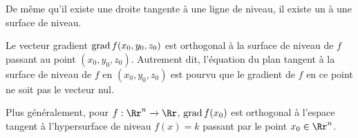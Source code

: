 \documentclass[11pt, class=report,crop=false]{standalone}
\begin{document}
De même qu'il existe une droite tangente à une ligne de niveau, il existe un  à une surface de niveau.


\begin{proposition}
Le vecteur gradient $\operatorname{grad} f(x_0,y_0,z_0)$ est orthogonal à la surface de niveau de $f$ passant au point $(x_0,y_0,z_0)$. Autrement dit, l'équation du plan tangent à la surface de niveau de $f$ en $(x_0,y_0,z_0)$ est 
pourvu que le gradient de $f$ en ce point ne soit pas le vecteur nul.
\end{proposition}




Plus généralement, pour $f : \Rr^n \to \Rr$, $\operatorname{grad} f (x_0)$ est orthogonal à l'espace tangent à l'hypersurface de niveau $f(x)=k$ passant par le point $x_0\in\Rr^n$.
\end{document}

